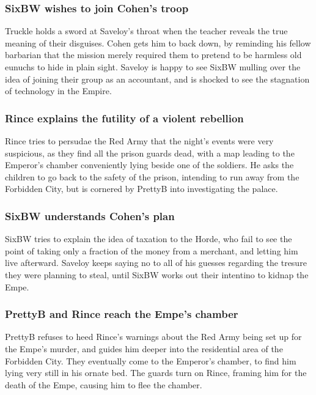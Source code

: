 \subsubsection{\Gls{SixBW} wishes to join \Gls{Cohen}'s troop}
\Gls{Truckle} holds a sword at \Gls{Saveloy}'s throat when the teacher reveals the true meaning of
their disguises. \Gls{Cohen} gets him to back down, by reminding his fellow barbarian that the
mission merely required them to pretend to be harmless old eunuchs to hide in plain sight.
\Gls{Saveloy} is happy to see \Gls{SixBW} mulling over the idea of joining their group as an
accountant, and is shocked to see the stagnation of technology in the Empire.

\subsubsection{\Gls{Rince} explains the futility of a violent rebellion}
\Gls{Rince} tries to persudae the Red Army that the night's events were very suspicious, as they
find all the prison guards dead, with a map leading to the Emperor's chamber conveniently lying
beside one of the soldiers. He asks the children to go back to the safety of the prison, intending
to run away from the Forbidden City, but is cornered by \Gls{PrettyB} into investigating the
palace.

\subsubsection{\Gls{SixBW} understands \Gls{Cohen}'s plan}
\Gls{SixBW} tries to explain the idea of taxation to the Horde, who fail to see the point of taking
only a fraction of the money from a merchant, and letting him live afterward. \Gls{Saveloy} keeps
saying no to all of his guesses regarding the tresure they were planning to steal, until
\Gls{SixBW} works out their intentino to kidnap the \Gls{Empe}.

\subsubsection{\Gls{PrettyB} and \Gls{Rince} reach the \Gls{Empe}'s chamber}
\Gls{PrettyB} refuses to heed \Gls{Rince}'s warnings about the Red Army being set up for the
\Gls{Empe}'s murder, and guides him deeper into the residential area of the Forbidden City. They
eventually come to the Emperor's chamber, to find him lying very still in his ornate bed. The
guards turn on \Gls{Rince}, framing him for the death of the \Gls{Empe}, causing him to flee the
chamber.

